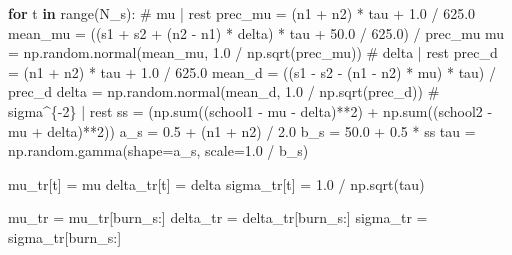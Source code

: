 \documentclass[
  letterpaper,
  DIV=11,
  numbers=noendperiod]{scrartcl}
\newenvironment{Shaded}{\begin{snugshade}}{\end{snugshade}}
\newcommand{\BuiltInTok}[1]{\textcolor[rgb]{0.00,0.23,0.31}{#1}}
\newcommand{\CommentTok}[1]{\textcolor[rgb]{0.37,0.37,0.37}{#1}}
\newcommand{\ControlFlowTok}[1]{\textcolor[rgb]{0.00,0.23,0.31}{\textbf{#1}}}
\newcommand{\DecValTok}[1]{\textcolor[rgb]{0.68,0.00,0.00}{#1}}
\newcommand{\FloatTok}[1]{\textcolor[rgb]{0.68,0.00,0.00}{#1}}
\newcommand{\KeywordTok}[1]{\textcolor[rgb]{0.00,0.23,0.31}{\textbf{#1}}}
\newcommand{\NormalTok}[1]{\textcolor[rgb]{0.00,0.23,0.31}{#1}}
\newcommand{\OperatorTok}[1]{\textcolor[rgb]{0.37,0.37,0.37}{#1}}
\begin{document}
\begin{Shaded}
\begin{Highlighting}[]
\ControlFlowTok{for}\NormalTok{ t }\KeywordTok{in} \BuiltInTok{range}\NormalTok{(N\_s):}
    \CommentTok{\# mu | rest}
\NormalTok{    prec\_mu }\OperatorTok{=}\NormalTok{ (n1 }\OperatorTok{+}\NormalTok{ n2) }\OperatorTok{*}\NormalTok{ tau }\OperatorTok{+} \FloatTok{1.0} \OperatorTok{/} \FloatTok{625.0}
\NormalTok{    mean\_mu }\OperatorTok{=}\NormalTok{ ((s1 }\OperatorTok{+}\NormalTok{ s2 }\OperatorTok{+}\NormalTok{ (n2 }\OperatorTok{{-}}\NormalTok{ n1) }\OperatorTok{*}\NormalTok{ delta) }\OperatorTok{*}\NormalTok{ tau }\OperatorTok{+} \FloatTok{50.0} \OperatorTok{/} \FloatTok{625.0}\NormalTok{) }\OperatorTok{/}\NormalTok{ prec\_mu}
\NormalTok{    mu }\OperatorTok{=}\NormalTok{ np.random.normal(mean\_mu, }\FloatTok{1.0} \OperatorTok{/}\NormalTok{ np.sqrt(prec\_mu))}
    \CommentTok{\# delta | rest}
\NormalTok{    prec\_d }\OperatorTok{=}\NormalTok{ (n1 }\OperatorTok{+}\NormalTok{ n2) }\OperatorTok{*}\NormalTok{ tau }\OperatorTok{+} \FloatTok{1.0} \OperatorTok{/} \FloatTok{625.0}
\NormalTok{    mean\_d }\OperatorTok{=}\NormalTok{ ((s1 }\OperatorTok{{-}}\NormalTok{ s2 }\OperatorTok{{-}}\NormalTok{ (n1 }\OperatorTok{{-}}\NormalTok{ n2) }\OperatorTok{*}\NormalTok{ mu) }\OperatorTok{*}\NormalTok{ tau) }\OperatorTok{/}\NormalTok{ prec\_d}
\NormalTok{    delta }\OperatorTok{=}\NormalTok{ np.random.normal(mean\_d, }\FloatTok{1.0} \OperatorTok{/}\NormalTok{ np.sqrt(prec\_d))}
    \CommentTok{\# sigma\^{}\{{-}2\} | rest}
\NormalTok{    ss }\OperatorTok{=}\NormalTok{ (np.}\BuiltInTok{sum}\NormalTok{((school1 }\OperatorTok{{-}}\NormalTok{ mu }\OperatorTok{{-}}\NormalTok{ delta)}\OperatorTok{**}\DecValTok{2}\NormalTok{)}
          \OperatorTok{+}\NormalTok{ np.}\BuiltInTok{sum}\NormalTok{((school2 }\OperatorTok{{-}}\NormalTok{ mu }\OperatorTok{+}\NormalTok{ delta)}\OperatorTok{**}\DecValTok{2}\NormalTok{))}
\NormalTok{    a\_s }\OperatorTok{=} \FloatTok{0.5} \OperatorTok{+}\NormalTok{ (n1 }\OperatorTok{+}\NormalTok{ n2) }\OperatorTok{/} \FloatTok{2.0}
\NormalTok{    b\_s }\OperatorTok{=} \FloatTok{50.0} \OperatorTok{+} \FloatTok{0.5} \OperatorTok{*}\NormalTok{ ss}
\NormalTok{    tau }\OperatorTok{=}\NormalTok{ np.random.gamma(shape}\OperatorTok{=}\NormalTok{a\_s, scale}\OperatorTok{=}\FloatTok{1.0} \OperatorTok{/}\NormalTok{ b\_s)}

\NormalTok{    mu\_tr[t]    }\OperatorTok{=}\NormalTok{ mu}
\NormalTok{    delta\_tr[t] }\OperatorTok{=}\NormalTok{ delta}
\NormalTok{    sigma\_tr[t] }\OperatorTok{=} \FloatTok{1.0} \OperatorTok{/}\NormalTok{ np.sqrt(tau)}

\NormalTok{mu\_tr    }\OperatorTok{=}\NormalTok{ mu\_tr[burn\_s:]}
\NormalTok{delta\_tr }\OperatorTok{=}\NormalTok{ delta\_tr[burn\_s:]}
\NormalTok{sigma\_tr }\OperatorTok{=}\NormalTok{ sigma\_tr[burn\_s:]}


\end{Highlighting}
\end{Shaded}
\end{document}
